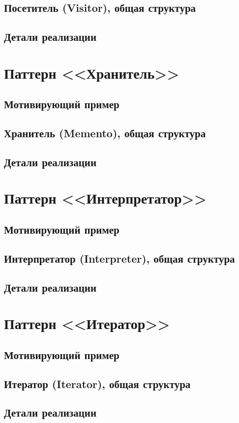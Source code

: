 \documentclass[a5paper]{article}
\begin{document}
\subsection{Посетитель (Visitor), общая структура}

\subsection{Детали реализации}



\section{Паттерн <<Хранитель>>}

\subsection{Мотивирующий пример}

\subsection{Хранитель (Memento), общая структура}

\subsection{Детали реализации}



\section{Паттерн <<Интерпретатор>>}

\subsection{Мотивирующий пример}

\subsection{Интерпретатор (Interpreter), общая структура}

\subsection{Детали реализации}



\section{Паттерн <<Итератор>>}

\subsection{Мотивирующий пример}

\subsection{Итератор (Iterator), общая структура}

\subsection{Детали реализации}
\end{document}
